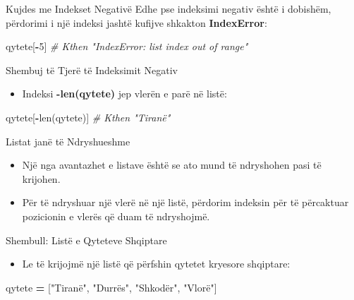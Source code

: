 \documentclass[
  ignorenonframetext,
]{beamer}
\newenvironment{Shaded}{\begin{snugshade}}{\end{snugshade}}
\newcommand{\BuiltInTok}[1]{#1}
\newcommand{\CommentTok}[1]{\textcolor[rgb]{0.56,0.35,0.01}{\textit{#1}}}
\newcommand{\DecValTok}[1]{\textcolor[rgb]{0.00,0.00,0.81}{#1}}
\newcommand{\NormalTok}[1]{#1}
\newcommand{\OperatorTok}[1]{\textcolor[rgb]{0.81,0.36,0.00}{\textbf{#1}}}
\newcommand{\StringTok}[1]{\textcolor[rgb]{0.31,0.60,0.02}{#1}}
\providecommand{\tightlist}{%
  \setlength{\itemsep}{0pt}\setlength{\parskip}{0pt}}
\begin{document}
\begin{frame}[fragile]{Kujdes me Indekset Negativë}
\protect\hypertarget{kujdes-me-indekset-negativuxeb}{}
Edhe pse indeksimi negativ është i dobishëm, përdorimi i një indeksi
jashtë kufijve shkakton \textbf{IndexError}:

\begin{Shaded}
\begin{Highlighting}[]
\NormalTok{qytete[}\OperatorTok{{-}}\DecValTok{5}\NormalTok{]  }\CommentTok{\# Kthen "IndexError: list index out of range"}
\end{Highlighting}
\end{Shaded}
\end{frame}

\begin{frame}[fragile]{Shembuj të Tjerë të Indeksimit Negativ}
\protect\hypertarget{shembuj-tuxeb-tjeruxeb-tuxeb-indeksimit-negativ}{}
\begin{itemize}
\tightlist
\item
  Indeksi \textbf{-len(qytete)} jep vlerën e parë në listë:
\end{itemize}

\begin{Shaded}
\begin{Highlighting}[]
\NormalTok{qytete[}\OperatorTok{{-}}\BuiltInTok{len}\NormalTok{(qytete)]  }\CommentTok{\# Kthen "Tiranë"}
\end{Highlighting}
\end{Shaded}
\end{frame}

\begin{frame}{Listat janë të Ndryshueshme}
\protect\hypertarget{listat-januxeb-tuxeb-ndryshueshme}{}
\begin{itemize}
\item
  Një nga avantazhet e listave është se ato mund të ndryshohen pasi të
  krijohen.
\item
  Për të ndryshuar një vlerë në një listë, përdorim indeksin për të
  përcaktuar pozicionin e vlerës që duam të ndryshojmë.
\end{itemize}
\end{frame}

\begin{frame}[fragile]{Shembull: Listë e Qyteteve Shqiptare}
\protect\hypertarget{shembull-listuxeb-e-qyteteve-shqiptare}{}
\begin{itemize}
\tightlist
\item
  Le të krijojmë një listë që përfshin qytetet kryesore shqiptare:
\end{itemize}

\begin{Shaded}
\begin{Highlighting}[]
\NormalTok{  qytete }\OperatorTok{=}\NormalTok{ [}\StringTok{"Tiranë"}\NormalTok{, }\StringTok{"Durrës"}\NormalTok{, }\StringTok{"Shkodër"}\NormalTok{, }\StringTok{"Vlorë"}\NormalTok{]}
\end{Highlighting}
\end{Shaded}
\end{frame}
\end{document}
